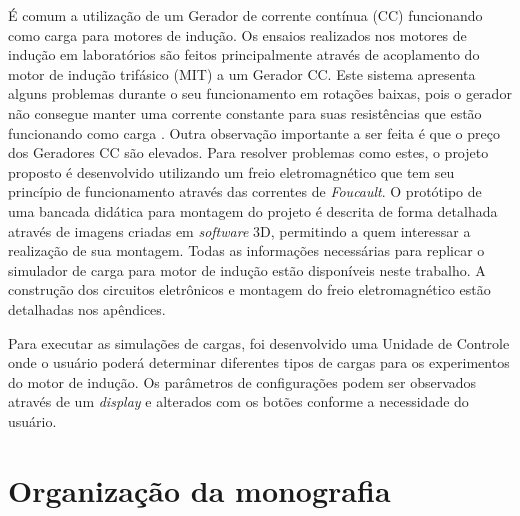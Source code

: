 É comum a utilização de um Gerador de corrente contínua (CC) funcionando como carga para motores de indução. Os ensaios realizados nos motores de indução em laboratórios são feitos principalmente através de acoplamento do motor de indução trifásico (MIT) a um Gerador CC. Este sistema apresenta alguns problemas durante o seu funcionamento em rotações baixas, pois o gerador não consegue manter uma corrente constante para suas resistências que estão funcionando como carga \cite{Denardi2013}. Outra observação importante a ser feita é que o preço dos Geradores CC são elevados. Para resolver problemas como estes, o projeto proposto é desenvolvido utilizando um freio eletromagnético que tem seu princípio de funcionamento através das correntes de \textit{Foucault}. O protótipo de uma bancada didática para montagem do projeto é descrita de forma detalhada através de imagens criadas em \textit{software} 3D, permitindo a quem interessar a realização de sua montagem. Todas as informações necessárias para replicar o simulador de carga para motor de indução estão disponíveis neste trabalho. A construção dos circuitos eletrônicos e montagem do freio eletromagnético estão detalhadas nos apêndices.

Para executar as simulações de cargas, foi desenvolvido uma Unidade de Controle onde o usuário poderá determinar diferentes tipos de cargas para os experimentos do motor de indução. Os parâmetros de configurações podem ser observados através de um \textit{display} e alterados com os botões conforme a necessidade do usuário.
 

\section{Organização da monografia}

